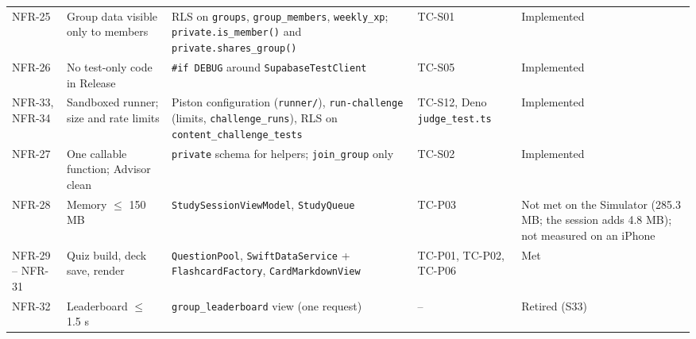 \documentclass[12pt,letterpaper]{article}
\begin{document}
\begin{xltabular}{\textwidth}{@{}l L{3.2cm} Y l L{2.6cm}@{}}
NFR-25 & Group data visible only to members & RLS on \texttt{groups}, \texttt{group\_members}, \texttt{weekly\_xp}; \texttt{private.is\_member()} and \texttt{private.shares\_group()} & TC-S01 & Implemented \\
NFR-26 & No test-only code in Release & \texttt{\#if DEBUG} around \texttt{SupabaseTestClient} & TC-S05 & Implemented \\
NFR-33, NFR-34 & Sandboxed runner; size and rate limits & Piston configuration (\texttt{runner/}), \texttt{run-challenge} (limits, \texttt{challenge\_runs}), RLS on \texttt{content\_challenge\_tests} & TC-S12, Deno \texttt{judge\_test.ts} & Implemented \\
NFR-27 & One callable function; Advisor clean & \texttt{private} schema for helpers; \texttt{join\_group} only & TC-S02 & Implemented \\
NFR-28 & Memory $\le$ 150 MB & \texttt{StudySessionViewModel}, \texttt{StudyQueue} & TC-P03 & Not met on the Simulator (285.3 MB; the session adds 4.8 MB); not measured on an iPhone \\
NFR-29 -- NFR-31 & Quiz build, deck save, render & \texttt{QuestionPool}, \texttt{SwiftDataService} + \texttt{FlashcardFactory}, \texttt{CardMarkdownView} & TC-P01, TC-P02, TC-P06 & Met \\
NFR-32 & Leaderboard $\le$ 1.5 s & \texttt{group\_leaderboard} view (one request) & -- & Retired (S33) \\
\end{xltabular}
\end{document}
